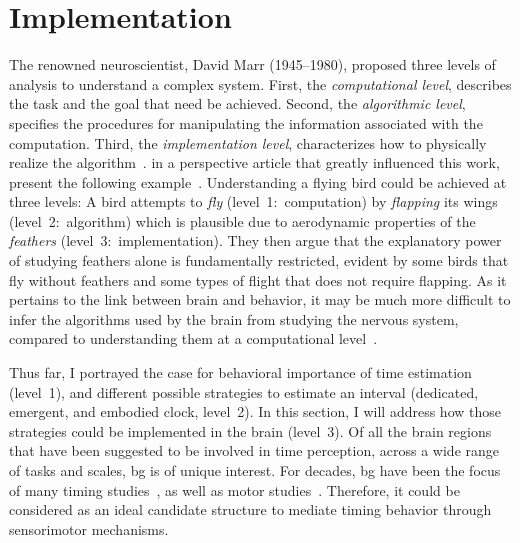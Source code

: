\section{Implementation}
\label{ch:intro:implementation}
The renowned neuroscientist, David Marr (1945--1980), proposed three levels of analysis to understand a complex system.
First, the \emph{computational level}, describes the task and the goal that need be achieved.
Second, the \emph{algorithmic level}, specifies the procedures for manipulating the information associated with the computation.
Third, the \emph{implementation level}, characterizes how to physically realize the algorithm~\cite{Willshaw2015Marr}.
 in a perspective article that greatly influenced this work, present the following example~\cite{Krakauer2017Neuron}.
Understanding a flying bird could be achieved at three levels:
A bird attempts to \textit{fly} (level~1:~computation) by \textit{flapping} its wings (level~2:~algorithm) which is plausible due to aerodynamic properties of the \textit{feathers} (level~3:~implementation).
They then argue that the explanatory power of studying feathers alone is fundamentally restricted, evident by some birds that fly without feathers and some types of flight that does not require flapping.
As it pertains to the link between brain and behavior, it may be much more difficult to infer the algorithms used by the brain from studying the nervous system, compared to understanding them at a computational level~\cite[see also][]{Jonas2017}.
\par
Thus far, I portrayed the case for behavioral importance of time estimation (level~1), and different possible strategies to estimate an interval (dedicated, emergent, and embodied clock, level~2).
In this section, I will address how those strategies could be implemented in the brain (level~3).
Of all the brain regions that have been suggested to be involved in time perception\footnotemark, across a wide range of tasks and scales, \gls{bg} is of unique interest.
For decades, \gls{bg} have been the focus of many timing studies~\cite[see][]{Paton2018NeuronRev}, as well as motor studies~\cite[see][]{Turner2010CurrOpinNeurobiol}.
Therefore, it could be considered as an ideal candidate structure to mediate timing behavior through sensorimotor mechanisms.

